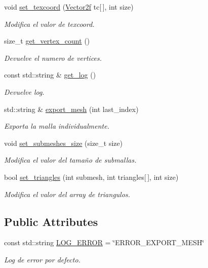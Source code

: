 \begin{DoxyCompactItemize}
void \mbox{\hyperlink{class_mesh_a0729b77413626492fb3bd15f7526adfc}{set\+\_\+texcoord}} (\mbox{\hyperlink{structmathexp_1_1_vector2f}{Vector2f}} tc\mbox{[}$\,$\mbox{]}, int size)
\begin{DoxyCompactList}\small\item\em Modifica el valor de texcoord. \end{DoxyCompactList}\item 
size\+\_\+t \mbox{\hyperlink{class_mesh_a6e64ec108d5b2e8f53b8b22dc1ba52af}{get\+\_\+vertex\+\_\+count}} ()
\begin{DoxyCompactList}\small\item\em Devuelve el numero de vertices. \end{DoxyCompactList}\item 
const std\+::string \& \mbox{\hyperlink{class_mesh_a7ac61f854653c3b6e0096252b2751588}{get\+\_\+log}} ()
\begin{DoxyCompactList}\small\item\em Devuelve log. \end{DoxyCompactList}\item 
std\+::string \& \mbox{\hyperlink{class_mesh_a6202023fe60714cd0762c64cdf17248e}{export\+\_\+mesh}} (int last\+\_\+index)
\begin{DoxyCompactList}\small\item\em Exporta la malla individualmente. \end{DoxyCompactList}\item 
void \mbox{\hyperlink{class_mesh_a37eeff1dbe843a226f88ae7f6ab48ff9}{set\+\_\+submeshes\+\_\+size}} (size\+\_\+t size)
\begin{DoxyCompactList}\small\item\em Modifica el valor del tamaño de submallas. \end{DoxyCompactList}\item 
bool \mbox{\hyperlink{class_mesh_a03a9a8e4d18d74aa23c66a134b7c4a4e}{set\+\_\+triangles}} (int submesh, int triangles\mbox{[}$\,$\mbox{]}, int size)
\begin{DoxyCompactList}\small\item\em Modifica el valor del array de triangulos. \end{DoxyCompactList}\end{DoxyCompactItemize}
\subsection*{Public Attributes}
\begin{DoxyCompactItemize}
\item 
const std\+::string \mbox{\hyperlink{class_mesh_a53395da1def300c2455ef4b8c7c326dc}{L\+O\+G\+\_\+\+E\+R\+R\+OR}} = \char`\"{}E\+R\+R\+O\+R\+\_\+\+E\+X\+P\+O\+R\+T\+\_\+\+M\+E\+SH\char`\"{}
\begin{DoxyCompactList}\small\item\em Log de error por defecto. \end{DoxyCompactList}\end{DoxyCompactItemize}


